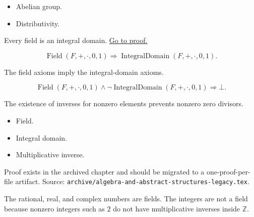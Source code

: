 \begin{remark*}[Dependencies]
\begin{itemize}
  \item Abelian group.
  \item Distributivity.
\end{itemize}
\end{remark*}

\begin{proposition}
\label{prop:field-is-domain}
Every field is an integral domain.
\hyperref[prf:field-is-domain]{Go to proof.}
\end{proposition}

\begin{remark*}
\[
\operatorname{Field}(F,+,\cdot,0,1)
\Longrightarrow
\operatorname{IntegralDomain}(F,+,\cdot,0,1).
\]
\end{remark*}

\begin{remark*}
The field axioms imply the integral-domain axioms.
\end{remark*}

\begin{remark*}
\[
\operatorname{Field}(F,+,\cdot,0,1)
\land
\neg\operatorname{IntegralDomain}(F,+,\cdot,0,1)
\Longrightarrow \bot.
\]
\end{remark*}

\begin{remark*}[Interpretation]
The existence of inverses for nonzero elements prevents nonzero zero divisors.
\end{remark*}

\begin{remark*}[Dependencies]
\begin{itemize}
  \item Field.
  \item Integral domain.
  \item Multiplicative inverse.
\end{itemize}
\end{remark*}

\begin{remark*}
Proof exists in the archived chapter and should be migrated to a
one-proof-per-file artifact.
Source: \texttt{archive/algebra-and-abstract-structures-legacy.tex}.
\end{remark*}

\begin{remark*}[Examples]
The rational, real, and complex numbers are fields.  The integers are not a
field because nonzero integers such as $2$ do not have multiplicative inverses
inside $\mathbb{Z}$.
\end{remark*}
